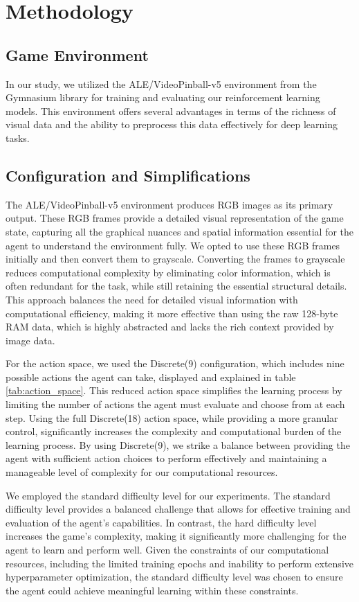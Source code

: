 \section{Methodology}
\subsection{Game Environment}
In our study, we utilized the ALE/VideoPinball-v5 environment from the Gymnasium library for training and evaluating our reinforcement learning models. This environment offers several advantages in terms of the richness of visual data and the ability to preprocess this data effectively for deep learning tasks. \cite{gymnasium}

\subsection{Configuration and Simplifications}
The ALE/VideoPinball-v5 environment produces RGB images as its primary output. These RGB frames provide a detailed visual representation of the game state, capturing all the graphical nuances and spatial information essential for the agent to understand the environment fully. We opted to use these RGB frames initially and then convert them to grayscale. Converting the frames to grayscale reduces computational complexity by eliminating color information, which is often redundant for the task, while still retaining the essential structural details. This approach balances the need for detailed visual information with computational efficiency, making it more effective than using the raw 128-byte RAM data, which is highly abstracted and lacks the rich context provided by image data. \cite{gymnasium}

For the action space, we used the Discrete(9) configuration, which includes nine possible actions the agent can take, displayed and explained in table \vref{tab:action_space}. This reduced action space simplifies the learning process by limiting the number of actions the agent must evaluate and choose from at each step. Using the full Discrete(18) action space, while providing a more granular control, significantly increases the complexity and computational burden of the learning process. By using Discrete(9), we strike a balance between providing the agent with sufficient action choices to perform effectively and maintaining a manageable level of complexity for our computational resources. \cite{gymnasium}



We employed the standard difficulty level for our experiments. The standard difficulty level provides a balanced challenge that allows for effective training and evaluation of the agent's capabilities. In contrast, the hard difficulty level increases the game's complexity, making it significantly more challenging for the agent to learn and perform well. Given the constraints of our computational resources, including the limited training epochs and inability to perform extensive hyperparameter optimization, the standard difficulty level was chosen to ensure the agent could achieve meaningful learning within these constraints. \cite{gymnasium} 

